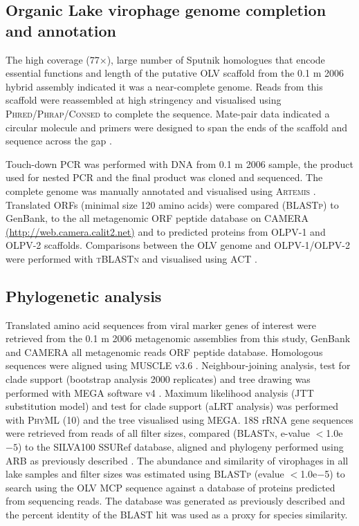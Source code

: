 \subsection[Genome completion and annotation]{Organic Lake virophage genome completion and annotation}
The high coverage (77$\times$), large number of Sputnik homologues that encode essential functions and length of the putative \ac{OLV} scaffold from the 0.1 \textmu{}m 2006 hybrid assembly indicated it was a near-complete genome. 
Reads from this scaffold were reassembled at high stringency and visualised using \textsc{Phred/Phrap/Consed} \cite{Gordon2004} to complete the sequence. 
Mate-pair data indicated a circular molecule and primers were designed to span the ends of the scaffold and sequence across the gap .
 
Touch-down \ac{PCR} was performed with \textsc{DNA} from 0.1 \textmu{}m 2006 sample, the product used for nested \ac{PCR} and the final product was cloned and sequenced. 
The complete genome was manually annotated and visualised using \textsc{Artemis} \cite{Rutherford2000}. 
Translated \acp{ORF} (minimal size 120 amino acids) were compared (\textsc{BLASTp}) to GenBank, to the all metagenomic \ac{ORF} peptide database on \ac{CAMERA} \url{(http://web.camera.calit2.net)} and to predicted proteins from \textsc{OLPV}-1 and \textsc{OLPV}-2 scaffolds. 
Comparisons between the \ac{OLV} genome and \textsc{OLPV}-1/\textsc{OLPV}-2 were performed with \textsc{tBLASTn} and visualised using \ac{ACT} \cite{Carver2005}. 

\subsection{Phylogenetic analysis}
Translated amino acid sequences from viral marker genes of interest were retrieved from the 0.1 \textmu{}m 2006 metagenomic assemblies from this study, GenBank and \ac{CAMERA} all metagenomic reads \ac{ORF} peptide database. 
Homologous sequences were aligned using \textsc{MUSCLE} v3.6 \cite{Edgar2004}. 
Neighbour-joining analysis, test for clade support (bootstrap analysis 2000 replicates) and tree drawing was performed with \ac{MEGA} software v4 \cite{Kumar2008}. 
Maximum likelihood analysis (\textsc{JTT} substitution model) and test for clade support (aLRT analysis) was performed with \textsc{PhyML} (10) and the tree visualised using \ac{MEGA}. 
18S \ac{rRNA} gene sequences were retrieved from reads of all filter sizes, compared (\textsc{BLASTn}, e-value $<$1.0e$-5$) to the \textsc{SILVA100} SSURef database, aligned and phylogeny performed using \textsc{ARB} as previously described \cite{Ng2010a, Lauro2011}. 
The abundance and similarity of virophages in all lake samples and filter sizes was estimated using \textsc{BLASTp} (evalue $<$1.0e$-$5) to search using the \ac{OLV} \ac{MCP} sequence against a database of proteins predicted from sequencing reads. 
The database was generated as previously described \cite{Proctor1990} and the percent identity of the \textsc{BLAST} hit was used as a proxy for species similarity. 

